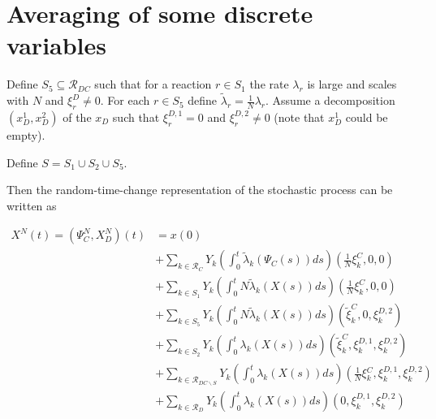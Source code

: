 \documentclass[english]{article}
\begin{document}
\section{Averaging of some discrete variables}

\label{sub:PDMP_averaging}

Define $S_{5} \subseteq \mathcal{R}_{DC}$ such that for a reaction
$r \in S_{1}$ the rate $\lambda_{r}$ is large and scales with $N$
and $\xi_{r}^{D} \neq 0$. For each $r \in S_{5}$ define
$\tilde{\lambda}_{r} = \frac{1}{N} \lambda_{r}$.
Assume a decomposition $\left( x_{D}^{1}, x_{D}^{2} \right)$ of the
$x_{D}$ such that $\xi_{r}^{D,1} = 0$ and $\xi_{r}^{D,2} \neq 0$
(note that $x_{D}^{1}$ could be empty).

Define $S = S_{1} \cup S_{2} \cup S_{5}$.

Then the random-time-change representation of the stochastic process
can be written as

\begin{align*}
    X^{N}(t) = \left( \Psi_{C}^{N}, X_{D}^{N} \right)(t) & = x(0) \\
     & + \sum_{k \in \mathcal{R}_{C}} Y_{k} \left(
            \int_{0}^{t} \tilde{\lambda}_{k}
            \left( \Psi_{C}(s) \right) ds
        \right) \left( \frac{1}{N} \xi_{k}^{C}, 0, 0 \right) \\
     & + \sum_{k \in S_{1}} Y_{k} \left(
            \int_{0}^{t} N \tilde{\lambda}_{k} \left( X(s) \right) ds
        \right) \left( \frac{1}{N} \xi_{k}^{C}, 0, 0 \right) \\
     & + \sum_{k \in S_{5}} Y_{k} \left(
            \int_{0}^{t} N \tilde{\lambda}_{k} \left( X(s) \right) ds
        \right) \left( \tilde{\xi}_{k}^{C}, 0, \xi_{k}^{D,2} \right) \\
     & + \sum_{k \in S_{2}} Y_{k} \left(
            \int_{0}^{t} \lambda_{k} \left( X(s) \right) ds
        \right) \left(
            \tilde{\xi}_{k}^{C}, \xi_{k}^{D,1}, \xi_{k}^{D,2}
        \right) \\
     & + \sum_{k \in \mathcal{R}_{DC \backslash S}} Y_{k} \left(
            \int_{0}^{t} \lambda_{k} \left( X(s) \right) ds
        \right) \left(
            \frac{1}{N} \xi{}_{k}^{C}, \xi_{k}^{D,1}, \xi_{k}^{D,2}
        \right) \\
     & + \sum_{k \in \mathcal{R}_{D}} Y_{k} \left(
            \int_{0}^{t} \lambda_{k} \left( X(s) \right) ds
        \right) \left( 0, \xi_{k}^{D,1}, \xi_{k}^{D,2} \right)
\end{align*}
\end{document}
